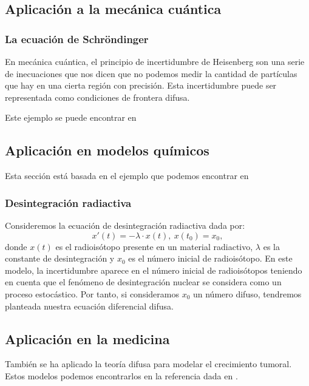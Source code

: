 \subsection{Aplicación a la mecánica cuántica}
\subsubsection{La ecuación de Schröndinger}
En mecánica cuántica, el principio de incertidumbre de Heisenberg son una serie de inecuaciones que nos dicen que no podemos medir la cantidad de partículas que hay en una cierta región con precisión. Esta incertidumbre puede ser representada como condiciones de frontera difusa. 

Este ejemplo se puede encontrar en \cite{schrondingerfuzzy}

\subsection{Aplicación en modelos químicos}
Esta sección está basada en el ejemplo que podemos encontrar en \cite{radiactive}

\subsubsection{Desintegración radiactiva}
\begin{ejemplo}
	Consideremos la ecuación de desintegración radiactiva dada por:
	\[
		x'(t) = - \lambda \cdot x(t), ~ x(t_0) = x_0,
	\]
	donde $x(t)$ es el radioisótopo presente en un material radiactivo, $\lambda$ es la constante de desintegración y $x_0$ es el número inicial de radioisótopo. En este modelo, la incertidumbre aparece en el número inicial de radioisótopos teniendo en cuenta que el fenómeno de desintegración nuclear se considera como un proceso estocástico. Por tanto, si consideramos $x_0$ un número difuso, tendremos planteada nuestra ecuación diferencial difusa.
\end{ejemplo}

\subsection{Aplicación en la medicina}
También se ha aplicado la teoría difusa para modelar el crecimiento tumoral. Estos modelos podemos encontrarlos en la referencia dada en \cite{Majumdar2004FuzzyDI}.
